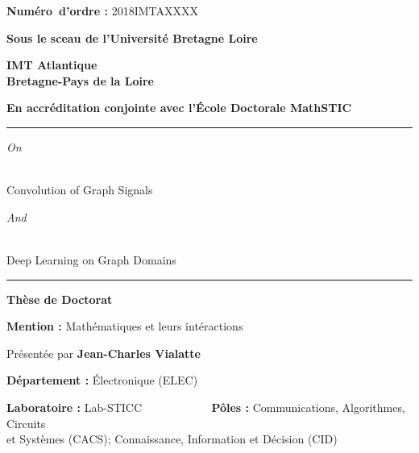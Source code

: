 
    \textbf{Numéro~d'ordre :} 2018IMTAXXXX
    \vfill
    
    \begin{center}
        \Large{\textbf{Sous le sceau de l'Université Bretagne Loire}}
    \end{center}
    \begin{center}
        \huge{\textbf{IMT Atlantique\\Bretagne-Pays de la Loire}}
    \end{center}
    \begin{center}
        \Large{\textbf{En accréditation conjointe avec l'École Doctorale MathSTIC}}
    \end{center}
    \vfill
    
    \rule{\textwidth}{1pt}
    \begin{center}
        \begin{large}\emph{On}\end{large}\\Convolution of Graph Signals\\\begin{large}\emph{And}\end{large}\\Deep Learning on Graph Domains
    \end{center}
    \rule{\textwidth}{1pt}
    \vfill
    
    \begin{center}
        \Large{\textbf{Thèse de Doctorat}}
    \end{center}
    \begin{center}
        \textbf{Mention :} Mathématiques et leurs intéractions
    \end{center}
    \vfill
    
    \begin{center}
        Présentée par \textbf{Jean-Charles Vialatte}
    \end{center}
    \begin{center}
        \textbf{Département :} Électronique (ELEC)
    \end{center}
    \begin{center}
        \textbf{Laboratoire :} Lab-STICC ~~~~~~~~~~~ \textbf{Pôles :} Communications, Algorithmes, Circuits\\et Systèmes (CACS); Connaissance, Information et Décision (CID)
    \end{center}
    \vfill
    

